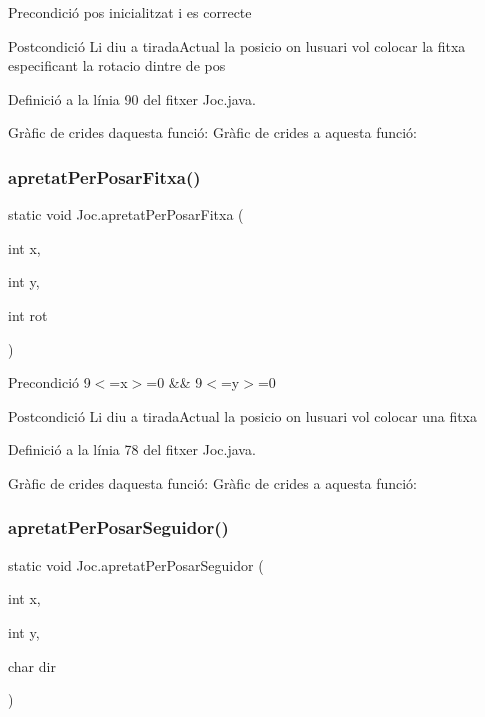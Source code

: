 \begin{DoxyPrecond}{Precondició}
pos inicialitzat i es correcte 
\end{DoxyPrecond}
\begin{DoxyPostcond}{Postcondició}
Li diu a tirada\+Actual la posicio on l\textquotesingle{}usuari vol colocar la fitxa especificant la rotacio dintre de pos 
\end{DoxyPostcond}


Definició a la línia 90 del fitxer Joc.\+java.

Gràfic de crides d\textquotesingle{}aquesta funció\+:
Gràfic de crides a aquesta funció\+:
\mbox{\label{class_joc_a90b306ce9d339455a5f6e5d2decf90f1}} 
\subsubsection{\texorpdfstring{apretat\+Per\+Posar\+Fitxa()}{apretatPerPosarFitxa()}}
{\footnotesize\ttfamily static void Joc.\+apretat\+Per\+Posar\+Fitxa (\begin{DoxyParamCaption}\item[{int}]{x,  }\item[{int}]{y,  }\item[{int}]{rot }\end{DoxyParamCaption})\hspace{0.3cm}{\ttfamily [static]}}

\begin{DoxyPrecond}{Precondició}
9$<$=x$>$=0 \&\& 9$<$=y$>$=0 
\end{DoxyPrecond}
\begin{DoxyPostcond}{Postcondició}
Li diu a tirada\+Actual la posicio on l\textquotesingle{}usuari vol colocar una fitxa 
\end{DoxyPostcond}


Definició a la línia 78 del fitxer Joc.\+java.

Gràfic de crides d\textquotesingle{}aquesta funció\+:
Gràfic de crides a aquesta funció\+:
\mbox{\label{class_joc_a72eed3f92b818584d664717fbb05d153}} 
\subsubsection{\texorpdfstring{apretat\+Per\+Posar\+Seguidor()}{apretatPerPosarSeguidor()}}
{\footnotesize\ttfamily static void Joc.\+apretat\+Per\+Posar\+Seguidor (\begin{DoxyParamCaption}\item[{int}]{x,  }\item[{int}]{y,  }\item[{char}]{dir }\end{DoxyParamCaption})\hspace{0.3cm}{\ttfamily [static]}}

